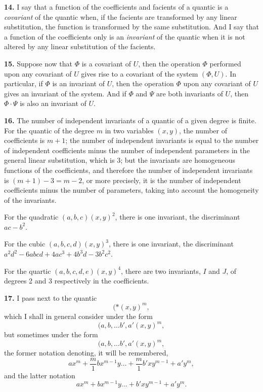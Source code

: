 \documentclass[11pt,a4paper]{book}
\begin{document}
\textbf{14.} I say that a function of the coefficients and facients of a quantic is a \textit{covariant} of the quantic when, if the facients are transformed by any linear substitution, the function is transformed by the same substitution. And I say that a function of the coefficients only is an \textit{invariant} of the quantic when it is not altered by any linear substitution of the facients.

\textbf{15.} Suppose now that $\Phi$ is a covariant of $U$, then the operation $\Phi$ performed upon any covariant of $U$ gives rise to a covariant of the system $(\Phi, U)$. In particular, if $\Phi$ is an invariant of $U$, then the operation $\Phi$ upon any covariant of $U$ gives an invariant of the system. And if $\Phi$ and $\Psi$ are both invariants of $U$, then $\Phi \cdot \Psi$ is also an invariant of $U$.

\newpage
\setcounter{page}{229}

\textbf{16.} The number of independent invariants of a quantic of a given degree is finite. For the quantic of the degree $m$ in two variables $(x, y)$, the number of coefficients is $m+1$; the number of independent invariants is equal to the number of independent coefficients minus the number of independent parameters in the general linear substitution, which is 3; but the invariants are homogeneous functions of the coefficients, and therefore the number of independent invariants is $(m+1) - 3 = m - 2$, or more precisely, it is the number of independent coefficients minus the number of parameters, taking into account the homogeneity of the invariants.

For the quadratic $(a, b, c)(x, y)^2$, there is one invariant, the discriminant $ac - b^2$.

For the cubic $(a, b, c, d)(x, y)^3$, there is one invariant, the discriminant $a^2d^2 - 6abcd + 4ac^3 + 4b^3d - 3b^2c^2$.

For the quartic $(a, b, c, d, e)(x, y)^4$, there are two invariants, $I$ and $J$, of degrees 2 and 3 respectively in the coefficients.

\textbf{17.} I pass next to the quantic
\[
(*\!\!\!\!\!(x, y)^m,
\]
which I shall in general consider under the form
\[
(a, b, \ldots b', a' \!\!\!\!(x, y)^m,
\]
but sometimes under the form
\[
(a, b, \ldots b', a' \!\!\!\!(x, y)^m,
\]
the former notation denoting, it will be remembered,
\[
ax^m + \frac{m}{1} bx^{m-1}y \ldots + \frac{m}{1} b'xy^{m-1} + a'y^m,
\]
and the latter notation
\[
ax^m + bx^{m-1}y \ldots + b'xy^{m-1} + a'y^m.
\]
\end{document}
